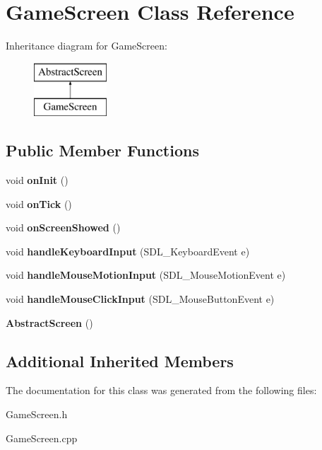 \hypertarget{class_game_screen}{}\section{Game\+Screen Class Reference}
\label{class_game_screen}
Inheritance diagram for Game\+Screen\+:\begin{figure}[H]
\begin{center}
\leavevmode
\includegraphics[height=2.000000cm]{class_game_screen}
\end{center}
\end{figure}
\subsection*{Public Member Functions}
\begin{DoxyCompactItemize}
\item 
\mbox{\label{class_game_screen_a2748a44cf5e9ebe46f4e2e603bbfbae3}} 
void {\bfseries on\+Init} ()
\item 
\mbox{\label{class_game_screen_a0e2549c9c0198f925df16203998bb53b}} 
void {\bfseries on\+Tick} ()
\item 
\mbox{\label{class_game_screen_a1dfaea8cc8d0edb3bd2711d20e97ebeb}} 
void {\bfseries on\+Screen\+Showed} ()
\item 
\mbox{\label{class_game_screen_ae0cb9f2e2ca4016debdffa7f778f5627}} 
void {\bfseries handle\+Keyboard\+Input} (S\+D\+L\+\_\+\+Keyboard\+Event e)
\item 
\mbox{\label{class_game_screen_af2fbc9a94d5b522870a9bfceea0f1da5}} 
void {\bfseries handle\+Mouse\+Motion\+Input} (S\+D\+L\+\_\+\+Mouse\+Motion\+Event e)
\item 
\mbox{\label{class_game_screen_abe56a9ed6eaac0df7459f681265e0dd2}} 
void {\bfseries handle\+Mouse\+Click\+Input} (S\+D\+L\+\_\+\+Mouse\+Button\+Event e)
\item 
\mbox{\label{class_game_screen_a9c46f578b910897d268ce46b5057bf50}} 
{\bfseries Abstract\+Screen} ()
\end{DoxyCompactItemize}
\subsection*{Additional Inherited Members}


The documentation for this class was generated from the following files\+:\begin{DoxyCompactItemize}
\item 
Game\+Screen.\+h\item 
Game\+Screen.\+cpp\end{DoxyCompactItemize}
